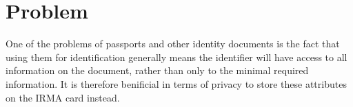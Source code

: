 \documentclass[a4paper, oneside]{scrartcl}
\begin{document}
\section{Problem}



One of the problems of passports and other identity documents is the fact that using them for identification generally means the identifier will have access to all information on the document, rather than only to the minimal required information. It is therefore benificial in terms of privacy to store these attributes on the IRMA card instead. 
\end{document}
